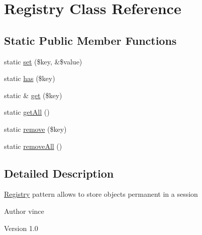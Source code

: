 \hypertarget{class_anemo_1_1_registry}{
\section{Registry Class Reference}
\label{class_anemo_1_1_registry}
}
\subsection*{Static Public Member Functions}
\begin{DoxyCompactItemize}
\item 
static \hyperlink{class_anemo_1_1_registry_a52f161839f00824f9d6f8638ae75f623}{set} (\$key, \&\$value)
\item 
static \hyperlink{class_anemo_1_1_registry_a8f660283f72e0f3c5f00b4f98563a79b}{has} (\$key)
\item 
static \& \hyperlink{class_anemo_1_1_registry_a7c33639232d3bb39570caffc5c8be969}{get} (\$key)
\item 
static \hyperlink{class_anemo_1_1_registry_aca7ae46d923aa798f1e29657bb767a22}{getAll} ()
\item 
static \hyperlink{class_anemo_1_1_registry_acc60f64095c2df2c0d1e48f9f3ffb9d8}{remove} (\$key)
\item 
static \hyperlink{class_anemo_1_1_registry_a1aff3b0cad0cc68676cecee4dc5fc625}{removeAll} ()
\end{DoxyCompactItemize}


\subsection{Detailed Description}
\hyperlink{class_anemo_1_1_registry}{Registry} pattern allows to store objects permanent in a session  \begin{DoxyAuthor}{Author}
vince 
\end{DoxyAuthor}
\begin{DoxyVersion}{Version}
1.0 
\end{DoxyVersion}



